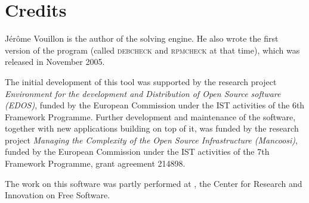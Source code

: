 
\section{Credits}
\label{sec:credits}

Jérôme Vouillon is the author of the solving engine. He also wrote the
first version of the program (called \textsc{debcheck} and
\textsc{rpmcheck} at that time), which was released in November 2005.

The initial development of this tool was supported by the research
project \emph{Environment for the development and Distribution of
  Open Source software (EDOS)}, funded by the European Commission
under the IST activities of the 6th Framework Programme. Further
development and maintenance of the software, together with new
applications building on top of it, was funded by the research project
\emph{Managing the Complexity of the Open Source Infrastructure
  (Mancoosi)}, funded by the European Commission under the IST
activities of the 7th Framework Programme, grant agreement 214898.

The work on this software was partly performed at
, the Center for Research and
Innovation on Free Software.

